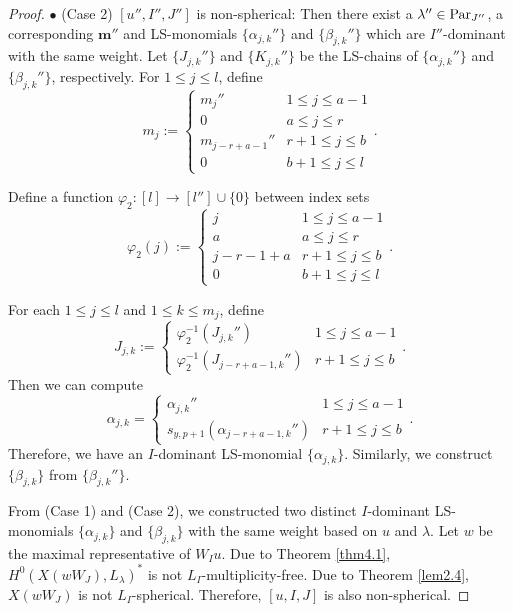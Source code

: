 \documentclass[12pt]{amsart}
\theoremstyle{definition}
\theoremstyle{remark}
\begin{document}
\begin{proof}
$\bullet$ (Case 2) $[u'',I'',J'']$ is non-spherical: Then there exist a $\lambda'' \in {\rm Par}_{J''}$, a corresponding $\mathbf{m}''$ and LS-monomials $\{\alpha_{j,k}''\}$ and $\{\beta_{j,k}''\}$ which are $I''$-dominant with the same weight. Let $\{J_{j,k}''\}$ and $\{K_{j,k}''\}$ be the LS-chains of $\{\alpha_{j,k}''\}$ and $\{\beta_{j,k}''\}$, respectively. For $1 \leq j \leq l$, define
\begin{equation}\label{eqn6.19}
m_j:=
\begin{cases}
m_j'' & 1 \leq j \leq a-1 \\
0 & a \leq j \leq r \\
m_{j-r+a-1}'' & r+1 \leq j \leq b \\
0 & b+1 \leq j \leq l
\end{cases}
.
\end{equation}

Define a function $\varphi_2 : [l] \rightarrow [l''] \cup \{0\}$ between index sets
\begin{equation}
\varphi_2 (j):=
\begin{cases}
j & 1 \leq j \leq a-1 \\
a & a \leq j \leq r \\
j-r-1+a & r+1 \leq j \leq b \\
0 & b+1 \leq j \leq l
\end{cases}
.
\end{equation}

For each $1 \leq j \leq l$ and $1 \leq k \leq m_j$, define
\begin{equation}
J_{j,k}:=
\begin{cases}
\varphi_2^{-1} (J_{j,k}'') & 1 \leq j \leq a-1 \\
\varphi_2^{-1} (J_{j-r+a-1,k}'') & r+1 \leq j \leq b
\end{cases}
.
\end{equation}
Then we can compute
\begin{equation}\label{eqn6.22}
\alpha_{j,k}=
\begin{cases}
\alpha_{j,k}'' & 1 \leq j \leq a-1 \\
s_{y,p+1}(\alpha_{j-r+a-1,k}'') & r+1 \leq j \leq b
\end{cases}
.
\end{equation}
Therefore, we have an $I$-dominant LS-monomial $\{\alpha_{j,k}\}$. Similarly, we construct $\{\beta_{j,k}\}$ from $\{\beta_{j,k}''\}$.

From (Case 1) and (Case 2), we constructed two distinct $I$-dominant LS-monomials $\{ \alpha_{j,k}\}$ and $\{ \beta_{j,k} \}$ with the same weight based on $u$ and $\lambda$. Let $w$ be the maximal representative of $W_I u$. Due to Theorem \ref{thm4.1}, $H^0(X(wW_J), L_\lambda)^*$ is not $L_I$-multiplicity-free. Due to Theorem \ref{lem2.4}, $X(wW_J)$ is not $L_I$-spherical. Therefore, $[u,I,J]$ is also non-spherical.


\end{proof}
\end{document}
